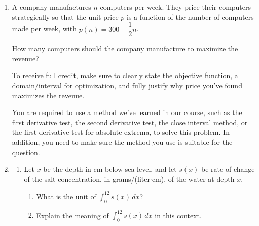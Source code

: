 \documentclass[11pt]{article}
\begin{document}
\begin{enumerate}
\newpage


\item A company manufactures $n$ computers per week. They price their computers strategically so that the unit price $p$ is a function of the number of computers made per week, with $p(n)=300-\dfrac{1}{2}n$.

How many computers should the company manufacture to maximize the revenue?

To receive full credit, make sure to clearly state the objective function, a domain/interval for optimization, and fully justify why price you've found maximizes the revenue. 

You are required to use a method we've learned in our course, such as the first derivative test, the second derivative test, the close interval method, or the first derivative test for absolute extrema, to solve this problem. In addition, you need to make sure the method you use is suitable for the question.


\newpage


\item 

\begin{enumerate}
    \item Let $x$ be the depth in cm below sea level, and let $s(x)$ be rate of change of the salt concentration, in grams/(liter$\cdot$cm), of the water at depth $x$.

    \begin{enumerate}
        \item[(i)] What is the unit of $\displaystyle\int_0^{12} s(x)\, dx$?

        \vfill

        \item[(ii)] Explain the meaning of $\displaystyle\int_0^{12} s(x)\, dx$ in this context.

        \vfill 
    \end{enumerate}


\end{enumerate}
\end{enumerate}
\end{document}
